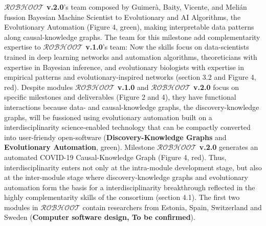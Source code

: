 \documentclass[11pt, a4paper]{article} %
\begin{document}
  {\bf $\mathcal{ROBHOOT}$ v.2.0}'s team composed by Guimer\`a, Baity,
  Vicente, and Meli\'an fussion Bayesian Machine Scientist to
  Evolutionary and AI Algorithms, the Evolutionary Automation (Figure
  4, green), making interpretable data patterns along causal-knowledge
  graphs. The team for this milestone add complementarity expertise to
  {\bf $\mathcal{ROBHOOT}$ v.1.0}'s team: Now the skills focus on
  data-scientists trained in deep learning networks and automation
  algorithms, theoreticians with expertise in Bayesian inference, and
  evolutionary biologists with expertise in empirical patterns and
  evolutionary-inspired networks (section 3.2 and Figure 4,
  red). Despite modules {\bf $\mathcal{ROBHOOT}$ v.1.0} and {\bf
    $\mathcal{ROBHOOT}$ v.2.0} focus on specific milestones and
  deliverables (Figure 2 and 4), they have functional interactions
  because data- and causal-knowledge graphs, the discovery-knowledge
  graphs, will be fussioned using evolutionary automation built on a
  interdisciplinarity science-enabled technology that can be compactly
  converted into user-friendy open-software ({\bf Discovery-Knowledge
    Graphs} and {\bf Evolutionary Automation}, green). Milestone {\bf
    $\mathcal{ROBHOOT}$ v.2.0} generates an automated COVID-19
  Causal-Knowledge Graph (Figure 4, red). Thus, interdisciplinarity
  enters not only at the intra-module development stage, but also at
  the inter-module stage where discovery-knowledge graphs and
  evolutionary automation form the basis for a interdisciplinarity
  breakthrough reflected in the highly complementarity skills of the
  consortium (section 4.1). The first two modules in {\bf
    $\mathcal{ROBHOOT}$} contain researchers from Estonia, Spain,
  Switzerland and Sweden ({\bf Computer software design, To be
    confirmed}).
  
\end{document}
